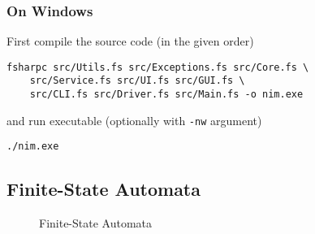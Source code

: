 \documentclass{article}
\begin{document}
\subsubsection{On Windows}

First compile the source code (in the given order)
\begin{verbatim}
fsharpc src/Utils.fs src/Exceptions.fs src/Core.fs \
	src/Service.fs src/UI.fs src/GUI.fs \
	src/CLI.fs src/Driver.fs src/Main.fs -o nim.exe
\end{verbatim}
and run executable (optionally with {\tt -nw} argument)
\begin{verbatim}
./nim.exe
\end{verbatim}

\subsection{Finite-State Automata}
\begin{figure}[H]
\label{fig:fsa}

\caption{Finite-State Automata}
\end{figure}
\end{document}
